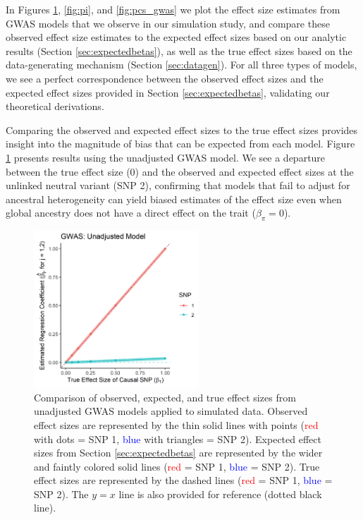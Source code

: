 \documentclass[12pt]{article}
\begin{document}
In Figures \ref{fig:unadjust}, \ref{fig:pi}, and \ref{fig:pcs_gwas} we plot the effect size estimates from GWAS models that we observe in our simulation study, and compare these observed effect size estimates to the expected effect sizes based on our analytic results (Section \ref{sec:expectedbetas}), as well as the true effect sizes based on the data-generating mechanism (Section \ref{sec:datagen}). 
For all three types of models, we see a perfect correspondence between the observed effect sizes and the expected effect sizes provided in Section \ref{sec:expectedbetas}, validating our theoretical derivations.

Comparing the observed and expected effect sizes to the true effect sizes provides insight into the magnitude of bias that can be expected from each model. 
Figure \ref{fig:unadjust} presents results using the unadjusted GWAS model.
We see a departure between the true effect size (0) and the observed and expected effect sizes at the unlinked neutral variant (SNP 2), confirming that models that fail to adjust for ancestral heterogeneity can yield biased estimates of the effect size even when global ancestry does not have a direct effect on the trait ($\beta_\pi = 0$).

\begin{figure}[!htb]
\centering
\includegraphics[width=0.55\textwidth]{figs/theorysims/sims_unadjusted}
\caption[Observed versus expected and true effect sizes from unadjusted GWAS models.]%
{Comparison of observed, expected, and true effect sizes from unadjusted GWAS models applied to simulated data. Observed effect sizes are represented by the thin solid lines with points (\textcolor{red}{red} with dots = SNP 1, \textcolor{blue}{blue} with triangles = SNP 2). 
Expected effect sizes from Section \ref{sec:expectedbetas} are represented by the wider and faintly colored solid lines (\textcolor{red}{red} = SNP 1, \textcolor{blue}{blue} = SNP 2).
True effect sizes are represented by the dashed lines (\textcolor{red}{red} = SNP 1, \textcolor{blue}{blue} = SNP 2).
The $y = x$ line is also provided for reference (dotted black line).}
\label{fig:unadjust}
\end{figure}
\end{document}

